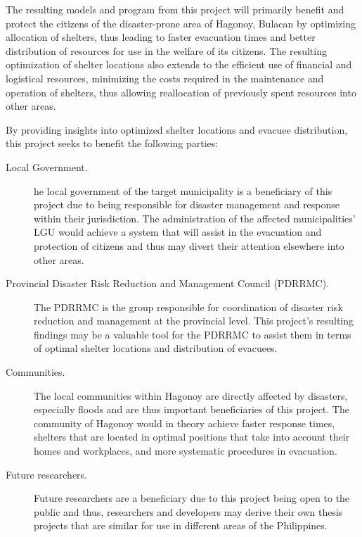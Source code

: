 The resulting models and program from this project will primarily benefit and protect the citizens of the disaster-prone area of Hagonoy, Bulacan by optimizing allocation of shelters, thus leading to faster evacuation times and better distribution of resources for use in the welfare of its citizens. The resulting optimization of shelter locations also extends to the efficient use of financial and logistical resources, minimizing the costs required in the maintenance and operation of shelters, thus allowing reallocation of previously spent resources into other areas.

By providing insights into optimized shelter locations and evacuee distribution, this project seeks to benefit the following parties:

\begin{description}
	\item[Local Government.] he local government of the target municipality is a beneficiary of this project due to being responsible for disaster management and response within their jurisdiction. The administration of the affected municipalities’ LGU would achieve a system that will assist in the evacuation and protection of citizens and thus may divert their attention elsewhere into other areas.
	
	\item[Provincial Disaster Risk Reduction and Management Council (PDRRMC).] The PDRRMC is the group responsible for coordination of disaster risk reduction and management at the provincial level. This project’s resulting findings may be a valuable tool for the PDRRMC to assist them in terms of optimal shelter locations and distribution of evacuees.
	
	\item[Communities.] The local communities within Hagonoy are directly affected by disasters, especially floods and are thus important beneficiaries of this project. The community of Hagonoy would in theory achieve faster response times, shelters that are located in optimal positions that take into account their homes and workplaces, and more systematic procedures in evacuation.
	
	\item[Future researchers.] Future researchers are a beneficiary due to this project being open to the public and thus, researchers and developers may derive their own thesis projects that are similar for use in different areas of the Philippines.
	
\end{description}

